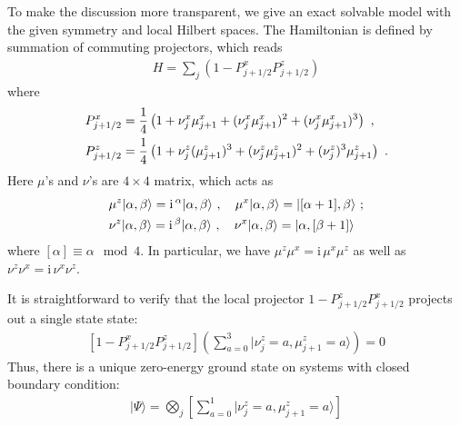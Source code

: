 \documentclass[reprint,amsmath,amssymb,aps,pra,]{revtex4-1}
\newcommand{\ii}{\mathrm{i}\,} %
\newcommand{\dg}{\dagger}
\begin{document}
To make the discussion more transparent, we give an exact solvable model with the given symmetry and local Hilbert spaces.
The Hamiltonian is defined by summation of commuting projectors, which reads
\begin{align}
  H=\sum_j(1-P^x_{j+1/2} P^z_{j+1/2})
  \label{}
\end{align}
where
\begin{align}
  &P^x_{j+1/2}=\frac{1}{4}\left( 1+\nu^x_{j}\mu^x_{j+1}+(\nu^x_j\mu^x_{j+1})^2+(\nu^x_{j}\mu^x_{j+1})^3 \right)~,\notag\\
  &P^z_{j+1/2}=\frac{1}{4}\left( 1+\nu^z_{j}(\mu^z_{j+1})^3+(\nu^z_j\mu^z_{j+1})^2+(\nu^z_{j})^3\mu^z_{j+1} \right)~.
  \label{eq:z4z4_reflection_1dspt_ham}
\end{align}
Here $\mu$'s and $\nu$'s are $4\times4$ matrix, which acts as
\begin{align}
  &\mu^z|\alpha,\beta\rangle=\ii^\alpha|\alpha,\beta\rangle~,\quad \mu^x|\alpha,\beta\rangle=|[\alpha+1],\beta\rangle~;\notag\\
  &\nu^z|\alpha,\beta\rangle=\ii^\beta|\alpha,\beta\rangle~,\quad \nu^x|\alpha,\beta\rangle=|\alpha,[\beta+1]\rangle
  \label{}
\end{align}
where $[\alpha]\equiv\alpha\!\!\mod 4$.
In particular, we have $\mu^z\mu^x=\ii\mu^x\mu^z$ as well as $\nu^z\nu^x=\ii\nu^x\nu^z$.

It is straightforward to verify that the local projector $1-P^z_{j+1/2}P^x_{j+1/2}$ projects out a single state state:
\begin{align}
  \left[ 1-P_{j+1/2}^xP_{j+1/2}^z \right] \left( \sum_{a=0}^3|\nu^z_{j}=a,\mu^z_{j+1}=a\rangle \right)=0
  \label{}
\end{align}
Thus, there is a unique zero-energy ground state on systems with closed boundary condition:
\begin{align}
  |\Psi\rangle=\bigotimes_j\left[ \sum_{a=0}^1|\nu_j^z=a,\mu_{j+1}^z=a\rangle \right]
  \label{eq:1d_gs_wf}
\end{align}
\end{document}
